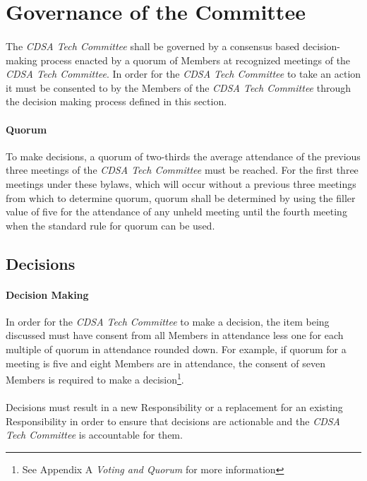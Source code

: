 \documentclass[12pt,letter,twocolumn,oneside,draft]{article}
\newcommand{\cname}{\emph{CDSA Tech Committee}}
\begin{document}
\section{Governance of the Committee}

\paragraph{}
The \cname{} shall be governed by a consensus based decision-making process
enacted by a quorum of Members at recognized meetings of the \cname{}. In order
for the \cname{} to take an action it must be consented to by the Members of
the \cname{} through the decision making process defined in this section.

\paragraph{Quorum}
To make decisions, a quorum of two-thirds the average attendance of the
previous three meetings of the \cname{} must be reached. For the first three
meetings under these bylaws, which will occur without a previous three meetings
from which to determine quorum, quorum shall be determined by using the filler
value of five for the attendance of any unheld meeting until the fourth meeting
when the standard rule for quorum can be used.

\subsection{Decisions}

\paragraph{Decision Making}
In order for the \cname{} to make a decision, the item being discussed must
have consent from all Members in attendance less one for each multiple of
quorum in attendance rounded down. For example, if quorum for a meeting is five
and eight Members are in attendance, the consent of seven Members is required
to make a decision\footnote{See Appendix A \emph{Voting and Quorum} for more information}.

\paragraph{}
Decisions must result in a new Responsibility or a replacement for an existing
Responsibility in order to ensure that decisions are actionable and the
\cname{} is accountable for them.
\end{document}
